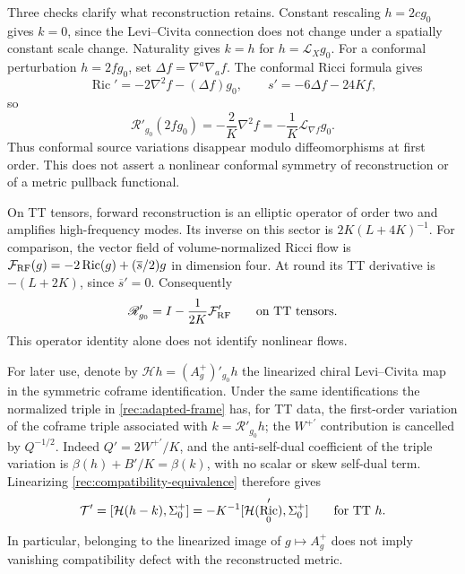 \documentclass[11pt]{article}
\numberwithin{equation}{section}
\theoremstyle{definition}
\theoremstyle{remark}
\DeclareMathOperator{\Ric}{Ric}
\begin{document}
Three checks clarify what reconstruction retains.  Constant rescaling
$h=2cg_0$ gives $k=0$, since the Levi--Civita connection does not change
under a spatially constant scale change.  Naturality gives $k=h$ for
$h=\mathcal L_Xg_0$.  For a conformal perturbation $h=2fg_0$, set
$\Delta f=\nabla^a\nabla_af$.  The conformal Ricci formula gives
\[
 \Ric'=-2\nabla^2f-(\Delta f)g_0,\qquad
 s'=-6\Delta f-24Kf,
\]
so
\begin{equation}
 \mathscr R'_{g_0}(2fg_0)
        =-\frac2K\nabla^2f
        =-\frac1K\mathcal L_{\nabla f}g_0.
 \label{rec:conformal-check}
\end{equation}
Thus conformal source variations disappear modulo diffeomorphisms
at first order.  This does not assert a nonlinear conformal symmetry
of reconstruction or of a metric pullback functional.

On TT tensors, forward reconstruction is an elliptic operator of
order two and amplifies high-frequency modes.  Its inverse on this
sector is $2K(L+4K)^{-1}$.  For comparison, the vector field of
volume-normalized Ricci flow is
$\mathcal F_{\rm RF}(g)=-2\Ric(g)+(\overline s/2)g$ in dimension four.
At round its TT derivative is $-(L+2K)$, since
$\overline s'=0$.  Consequently
\begin{equation}
 \mathscr R'_{g_0}=I-\frac1{2K}\mathcal F_{\rm RF}'
                  \qquad\hbox{on TT tensors}.
 \label{rec:resolvent-comparison}
\end{equation}
This operator identity alone does not identify nonlinear flows.

For later use, denote by
$\mathcal Hh=(A_g^+)'_{g_0}h$ the linearized chiral Levi--Civita map
in the symmetric coframe identification.  Under the same
identifications the normalized triple in
\eqref{rec:adapted-frame} has, for TT data, the first-order variation
of the coframe triple associated with $k=\mathscr R'_{g_0}h$; the
$W^{+\prime}$ contribution is cancelled by $Q^{-1/2}$.
Indeed $Q'=2W^{+\prime}/K$, and the anti-self-dual coefficient of
the triple variation is
$\beta(h)+B'/K=\beta(k)$, with no scalar or skew self-dual term.
Linearizing \eqref{rec:compatibility-equivalence} therefore gives
\begin{equation}
 \mathcal T'=[\mathcal H(h-k),\Sigma_0^+]
     =-K^{-1}[\mathcal H(\Ric_0'),\Sigma_0^+]
                     \qquad\hbox{for TT }h.
 \label{rec:linear-compatibility}
\end{equation}
In particular, belonging to the linearized image of
$g\mapsto A_g^+$ does not imply vanishing compatibility defect with
the reconstructed metric.
\end{document}
